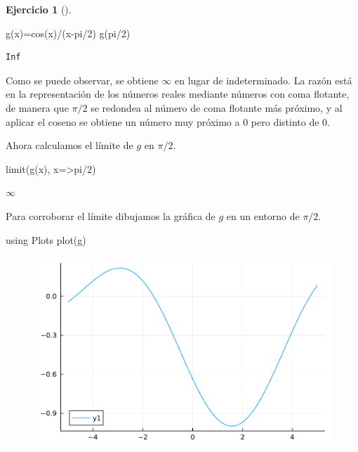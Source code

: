 \documentclass[
  a4paper,
]{scrreport}
\newenvironment{Shaded}{\begin{snugshade}}{\end{snugshade}}
\newcommand{\BuiltInTok}[1]{\textcolor[rgb]{0.00,0.23,0.31}{#1}}
\newcommand{\ConstantTok}[1]{\textcolor[rgb]{0.56,0.35,0.01}{#1}}
\newcommand{\FloatTok}[1]{\textcolor[rgb]{0.68,0.00,0.00}{#1}}
\newcommand{\FunctionTok}[1]{\textcolor[rgb]{0.28,0.35,0.67}{#1}}
\newcommand{\ImportTok}[1]{\textcolor[rgb]{0.00,0.46,0.62}{#1}}
\newcommand{\NormalTok}[1]{\textcolor[rgb]{0.00,0.23,0.31}{#1}}
\newcommand{\OperatorTok}[1]{\textcolor[rgb]{0.37,0.37,0.37}{#1}}
\theoremstyle{definition}
\newtheorem{exercise}{Ejercicio}[chapter]
\theoremstyle{remark}
\begin{document}
\begin{exercise}[]
\begin{tcolorbox}
\begin{Shaded}
\begin{Highlighting}[]
\FunctionTok{g}\NormalTok{(x)}\OperatorTok{=}\FunctionTok{cos}\NormalTok{(x)}\OperatorTok{/}\NormalTok{(x}\OperatorTok{{-}}\ConstantTok{pi}\OperatorTok{/}\FloatTok{2}\NormalTok{)}
\FunctionTok{g}\NormalTok{(}\ConstantTok{pi}\OperatorTok{/}\FloatTok{2}\NormalTok{)}
\end{Highlighting}
\end{Shaded}

\begin{verbatim}
Inf
\end{verbatim}

Como se puede observar, se obtiene \(\infty\) en lugar de indeterminado.
La razón está en la representación de los números reales mediante
números con coma flotante, de manera que \(\pi/2\) se redondea al número
de coma flotante más próximo, y al aplicar el coseno se obtiene un
número muy próximo a \(0\) pero distinto de \(0\).

Ahora calculamos el límite de \(g\) en \(\pi/2\).

\begin{Shaded}
\begin{Highlighting}[]
\FunctionTok{limit}\NormalTok{(}\FunctionTok{g}\NormalTok{(x), x}\OperatorTok{=\textgreater{}}\ConstantTok{pi}\OperatorTok{/}\FloatTok{2}\NormalTok{)}
\end{Highlighting}
\end{Shaded}

$\infty$

Para corroborar el límite dibujamos la gráfica de \(g\) en un entorno de
\(\pi/2\).

\begin{Shaded}
\begin{Highlighting}[]
\ImportTok{using} \BuiltInTok{Plots}
\FunctionTok{plot}\NormalTok{(g)}
\end{Highlighting}
\end{Shaded}

\begin{figure}[H]

{\centering \includegraphics{./limites_files/figure-pdf/cell-21-output-1.pdf}

}
\end{figure}
\end{tcolorbox}
\end{exercise}
\end{document}
